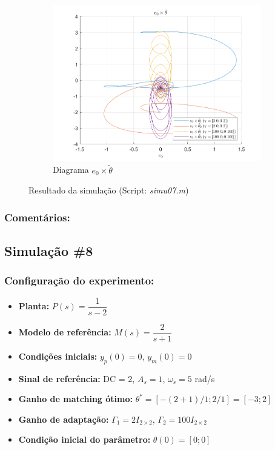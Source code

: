 \documentclass[10pt]{article}
\begin{document}
\begin{figure}[h!]
    \begin{subfigure}[b]{0.35\textwidth}
        \centering
        \includegraphics[width=\textwidth]{img/fig07d.png}
        \caption{Diagrama $e_0 \times \tilde{\theta}$}
    \end{subfigure}

    \caption{Resultado da simulação (Script: \textit{simu07.m})}
    \label{fig:sim7}
\end{figure}

\subsubsection{Comentários:}

\newpage

\subsection{Simulação \#8}
\subsubsection{Configuração do experimento:}
\begin{itemize}
\item \textbf{Planta:} $P(s) = \dfrac{1}{s - 2}$
\item \textbf{Modelo de referência:} $M(s) = \dfrac{2}{s + 1}$
\item \textbf{Condições iniciais:} $y_p(0)=0$, $y_m(0)=0$
\item \textbf{Sinal de referência:} DC = 2, $A_s=1$, $\omega_s=5$ rad/s
\item \textbf{Ganho de matching ótimo:} $\theta^* = [-(2+1)/1;2/1] = [-3;2]$
\item \textbf{Ganho de adaptação:} $\Gamma_1 = 2I_{2\times2}$, $\Gamma_2 = 100I_{2\times2}$
\item \textbf{Condição inicial do parâmetro:} $\theta(0) = [0;0]$
\end{itemize}
\end{document}
